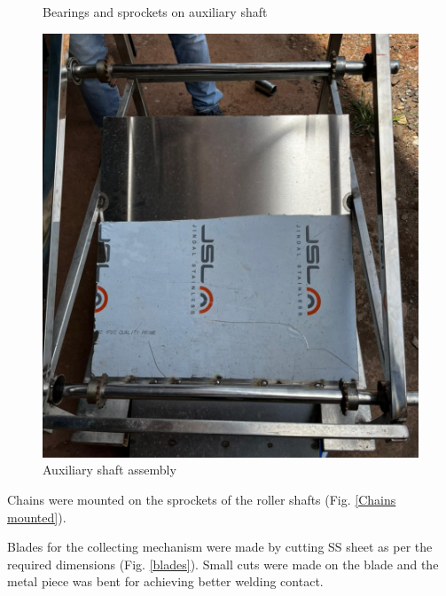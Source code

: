 \begin{figure}[H]
\begin{minipage}{0.185\textwidth}
       \caption{Bearings and sprockets on auxiliary shaft}
    \label{fig:Bearings and sprockets on auxiliary shaft}
    \end{minipage}
\hfill
    \begin{minipage}{0.40\textwidth}
    \centering
      \includegraphics[width=1\textwidth]{bea spro ass.jpg}
      \caption{Auxiliary shaft assembly}
      \label{fig:Auxiliary shaft assembly}
    \end{minipage}
\end{figure}

Chains were mounted on the sprockets of the roller shafts (Fig. \ref{Chains mounted}).

Blades for the collecting mechanism were made by cutting SS sheet as per the required dimensions (Fig. \ref{blades}). Small cuts were made on the blade and the metal piece was bent for achieving better welding contact. 

